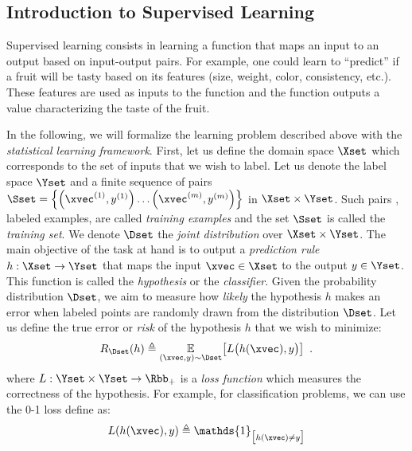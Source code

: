 \subsection{Introduction to Supervised Learning}
\label{subsection:ch2-introduction_on_supervised_learning}

Supervised learning consists in learning a function that maps an input to an output based on input-output pairs.
For example, one could learn to ``predict'' if a fruit will be tasty based on its features (\eg size, weight, color, consistency, etc.).
These features are used as inputs to the function and the function outputs a value characterizing the taste of the fruit.

In the following, we will formalize the learning problem described above with the \emph{statistical learning framework}.
First, let us define the domain space $\Xset$ which corresponds to the set of inputs that we wish to label.
Let us denote the label space $\Yset$ and a finite sequence of pairs $\Sset = \left\{ \left(\xvec^{(1)}, y^{(1)} \right) \dots \left( \xvec^{(m)}, y^{(m)} \right) \right\}$ in $\Xset \times \Yset$.
Such pairs \ie, labeled examples, are called \emph{training examples} and the set $\Sset$ is called the \emph{training set}.
We denote $\Dset$ the \emph{joint distribution} over $\Xset \times \Yset$.
The main objective of the task at hand is to output a \emph{prediction rule} $h: \Xset \rightarrow \Yset$ that maps the input $\xvec \in \Xset$ to the output $y \in \Yset$.
This function is called the \emph{hypothesis} or the \emph{classifier}.
Given the probability distribution $\Dset$, we aim to measure how \emph{likely} the hypothesis $h$ makes an error when labeled points are randomly drawn from the distribution $\Dset$.
Let us define the true error or \emph{risk} of the hypothesis $h$ that we wish to minimize:
\begin{equation} \label{equation:ch2-risk}
  R_{\Dset}(h) \triangleq \Ebb_{(\xvec, y) \sim \Dset} \left[ L\big( h(\xvec), y \big) \right] \enspace.
\end{equation}
where $L: \Yset \times \Yset \rightarrow \Rbb_{+}$ is a \emph{loss function} which measures the correctness of the hypothesis.
For example, for classification problems, we can use the 0-1 loss define as: %
\begin{equation}
  L(h(\xvec), y) \triangleq \mathds{1}_{\big[ h(\xvec) \neq y \big]}
\end{equation}

